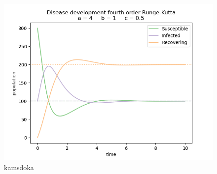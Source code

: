 \begin{figure}[!h]
    \centering
    \includegraphics[scale=0.5]{plots/RK_solver_default_a_4_b_1_c_0.5.png}
    \caption{kamsdoka}
    \label{fig:default}
\end{figure}